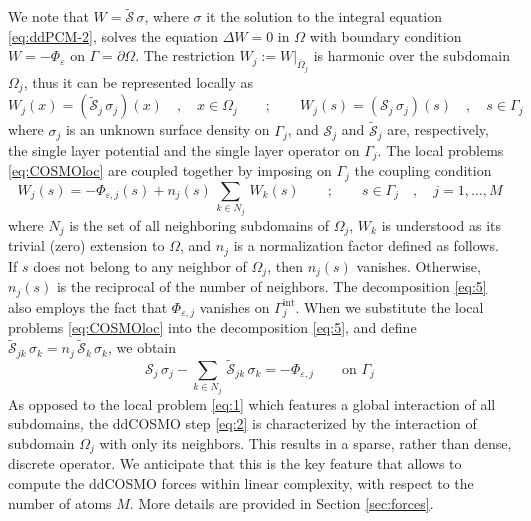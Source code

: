 \documentclass[aip,jcp,a4paper,11pt]{revtex4-1}
\newcommand{\cS}{\mathcal{S}}
\newcommand{\black}{\color{black}}
\begin{document}
We note that $W = \tilde{\mathcal{S}}\,\sigma$, where $\sigma$ it the solution to the integral equation \eqref{eq:ddPCM-2}, solves the equation $\Delta W = 0$ in $\Omega$ with boundary condition $W=-\Phi_\varepsilon$ on $\Gamma=\partial \Omega$. 
The restriction $W_j := W |_{\overline{\Omega}_j}$ is harmonic over the subdomain $\Omega_j$, thus it can be represented locally as 
\begin{equation}\label{eq:COSMOloc}
W_j(x) = (\tilde{\mathcal{S}}_j \,  \sigma_j) (x) \quad , \quad x \in \Omega_j \qquad ; \qquad
W_j(s) = (\mathcal{S}_j \,  \sigma_j) (s) \quad , \quad s \in \Gamma_j
\end{equation}
where $\sigma_j$ is an unknown surface density on $\Gamma_j$, and $\cS_j$ and $\tilde{\cS}_j$ are, respectively, the single layer potential and the single layer operator on $\Gamma_j$. The local problems \eqref{eq:COSMOloc} are coupled together by imposing on $\Gamma_j$ the coupling condition
\begin{equation}\label{eq:5}
W_j(s) = - \Phi_{\varepsilon,j}(s) +  n_j(s) \, \sum_{k \in N_j} \,{W}_k(s) \qquad ; \qquad s \in \Gamma_j \quad , \quad j = 1, \ldots , M
\end{equation}
where $N_j$ is the set of all neighboring subdomains of $\Omega_j$, $W_k$ is understood as its trivial (zero) extension to $\Omega$, and $n_j$ is a normalization factor defined as follows. If $s$ does not belong to any neighbor of $\Omega_j$, then $n_j(s)$ vanishes. Otherwise, $n_j(s)$ is the reciprocal of the number of neighbors. The decomposition \eqref{eq:5} also employs the fact that $\Phi_{\varepsilon,j}$ vanishes on $\Gamma_j^\text{int}$. When we substitute the local problems \eqref{eq:COSMOloc} into the decomposition \eqref{eq:5}, and define $\tilde{\cS}_{jk} \, \sigma_k = n_j \, \tilde{\cS}_k \, \sigma_k$, we obtain
\begin{equation}\label{eq:2}
\mathcal{S}_j \, \sigma_j  -  \sum_{k \in N_j} \, \tilde{\mathcal{S}}_{jk} \, \sigma_k = -  \Phi_{\varepsilon,j} \qquad \text{on } \Gamma_j
\end{equation}
As opposed to the local problem \eqref{eq:1} which features a global interaction of all subdomains, the ddCOSMO step \eqref{eq:2} is characterized by the interaction of subdomain $\Omega_j$ with only its neighbors. This results in a sparse, rather than dense, discrete operator. We anticipate that this is the key feature that allows to compute the ddCOSMO forces within linear complexity, with respect to the number of atoms $M$. More details are provided in Section \ref{sec:forces}.
\black 
\end{document}
